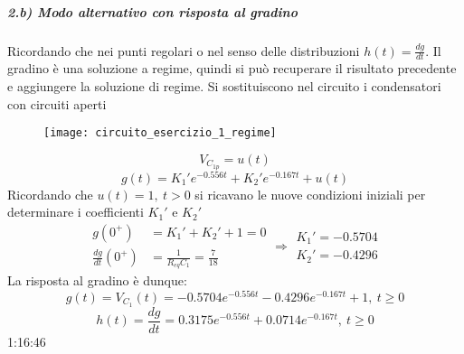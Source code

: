 \subparagraph{2.b) Modo alternativo con risposta al gradino}
Ricordando che nei punti regolari o nel senso delle distribuzioni $h(t) = \frac{dg}{dt}$.
Il gradino è una soluzione a regime, quindi si può recuperare il risultato precedente
e aggiungere la soluzione di regime.
Si sostituiscono nel circuito i condensatori con circuiti aperti
\begin{figure}[H]
\centering
\texttt{[image: circuito\_esercizio\_1\_regime]}
\end{figure}
$$
V_{C_{1p}} = u(t)
$$
$$
g(t) = K_1'e^{-0.556t} + K_2'e^{-0.167 t} + u(t)
$$
Ricordando che $u(t)=1,\ t>0$ si ricavano le nuove condizioni iniziali per determinare
i coefficienti $K_1'$ e $K_2'$
$$
\begin{aligned}
g(0^+) &= K_1' + K_2' + 1 = 0\\
\frac{dg}{dt}(0^+) &= \frac{1}{R_{eq}C_1} = \frac{7}{18}
\end{aligned}
\Rightarrow
\begin{aligned}
K_1' = -0.5704 \\
K_2' = -0.4296
\end{aligned}
$$
La risposta al gradino è dunque:
$$
g(t) = V_{C_1}(t) = -0.5704 e^{-0.556t} - 0.4296e^{-0.167t} + 1,\ t\geq 0
$$
$$
h(t) = \frac{dg}{dt} = 0.3175e^{-0.556t}+0.0714e^{-0.167 t},\ t\geq 0
$$
1:16:46
